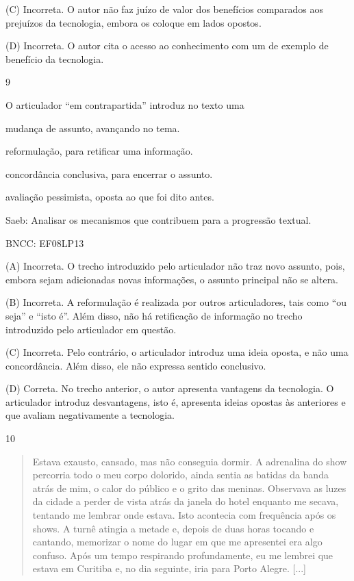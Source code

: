 (C) Incorreta. O autor não faz juízo de valor dos benefícios comparados
aos prejuízos da tecnologia, embora os coloque em lados opostos.

(D) Incorreta. O autor cita o acesso ao conhecimento com um de exemplo
de benefício da tecnologia.

\num{9}

O articulador ``em contrapartida'' introduz no texto uma

\begin{escolha}
\item mudança de assunto, avançando no tema.

\item reformulação, para retificar uma informação.

\item concordância conclusiva, para encerrar o assunto.

\item avaliação pessimista, oposta ao que foi dito antes.
\end{escolha}

Saeb: Analisar os mecanismos que contribuem para a progressão textual.

BNCC: EF08LP13

(A) Incorreta. O trecho introduzido pelo articulador não traz novo
assunto, pois, embora sejam adicionadas novas informações, o assunto
principal não se altera.

(B) Incorreta. A reformulação é realizada por outros articuladores, tais
como ``ou seja'' e ``isto é''. Além disso, não há retificação de
informação no trecho introduzido pelo articulador em questão.

(C) Incorreta. Pelo contrário, o articulador introduz uma ideia oposta,
e não uma concordância. Além disso, ele não expressa sentido conclusivo.

(D) Correta. No trecho anterior, o autor apresenta vantagens da
tecnologia. O articulador introduz desvantagens, isto é, apresenta
ideias opostas às anteriores e que avaliam negativamente a tecnologia.

\num{10}

\begin{quote}
Estava exausto, cansado, mas não conseguia dormir. A adrenalina do show
percorria todo o meu corpo dolorido, ainda sentia as batidas da banda
atrás de mim, o calor do público e o grito das meninas. Observava as
luzes da cidade a perder de vista atrás da janela do hotel enquanto me
secava, tentando me lembrar onde estava. Isto acontecia com frequência
após os shows. A turnê atingia a metade e, depois de duas horas tocando
e cantando, memorizar o nome do lugar em que me apresentei era algo
confuso. Após um tempo respirando profundamente, eu me lembrei que
estava em Curitiba e, no dia seguinte, iria para Porto Alegre. {[}...{]}
\end{quote}

